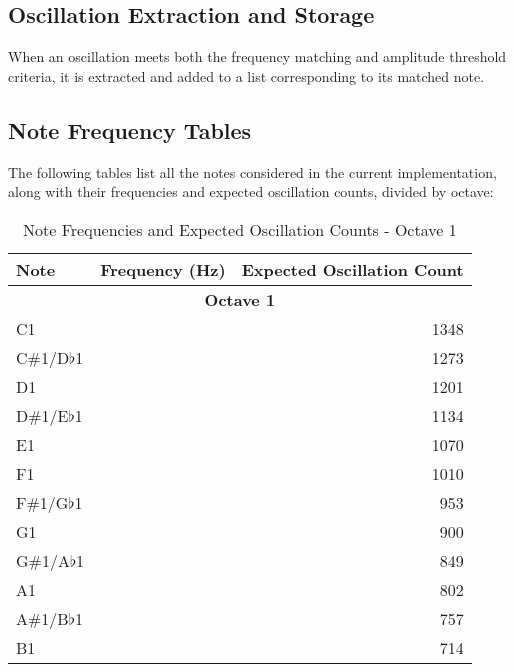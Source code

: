 \documentclass[12pt,a4paper]{article}
\begin{document}
\subsection{Oscillation Extraction and Storage}
When an oscillation meets both the frequency matching and amplitude threshold criteria, it is extracted and added to a list corresponding to its matched note.

\subsection{Note Frequency Tables}
The following tables list all the notes considered in the current implementation, along with their frequencies and expected oscillation counts, divided by octave:

\newcommand{\notetable}[2]{
\begin{table}[H]
\centering
\footnotesize
\begin{tabularx}{\linewidth}{@{}l>{\centering\arraybackslash}Xr@{}}
\toprule
Note & Frequency (Hz) & Expected Oscillation Count \\
\midrule
\multicolumn{3}{c}{\textbf{Octave 1}} \\
\midrule
#1
\bottomrule
\end{tabularx}
\caption{Note Frequencies and Expected Oscillation Counts - Octave #2}
\label{table:note_frequencies_#2}
\end{table}
}

\newcommand{\noterow}[3]{
#1 & #2 & #3 \\
}

\notetable{
\noterow{C1}{32.70}{1348}
\rowcolor{gray!10}
\noterow{C\#1/D$\flat$1}{34.65}{1273}
\noterow{D1}{36.71}{1201}
\rowcolor{gray!10}
\noterow{D\#1/E$\flat$1}{38.89}{1134}
\noterow{E1}{41.20}{1070}
\rowcolor{gray!10}
\noterow{F1}{43.65}{1010}
\noterow{F\#1/G$\flat$1}{46.25}{953}
\rowcolor{gray!10}
\noterow{G1}{49.00}{900}
\noterow{G\#1/A$\flat$1}{51.91}{849}
\rowcolor{gray!10}
\noterow{A1}{55.00}{802}
\noterow{A\#1/B$\flat$1}{58.27}{757}
\rowcolor{gray!10}
\noterow{B1}{61.74}{714}
}{1}
\end{document}
